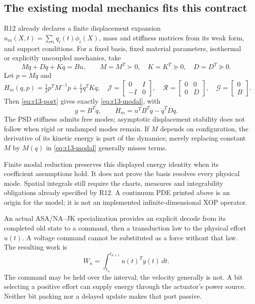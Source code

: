 \subsection{The existing modal mechanics fits this contract}
R12 already declares a finite displacement expansion
$u_m(X,t)=\sum_iq_i(t)\phi_i(X)$, mass and stiffness matrices from its weak
form, and support conditions. For a fixed basis, fixed material parameters,
isothermal or explicitly uncoupled mechanics, take
\begin{equation}
 M\ddot q+D\dot q+Kq=B u,\qquad
 M=M^T\succ0,\quad K=K^T\succeq0,\quad D=D^T\succeq0.
 \label{eq:r13-modal}
\end{equation}
Let $p=M\dot q$ and
\begin{equation}
 H_m(q,p)=\tfrac12p^TM^{-1}p+\tfrac12q^TKq,
 \quad
 \mathcal J=\begin{bmatrix}0&I\\-I&0\end{bmatrix},\quad
 \mathcal R=\begin{bmatrix}0&0\\0&D\end{bmatrix},\quad
 \mathcal G=\begin{bmatrix}0\\B\end{bmatrix}.
\end{equation}
Then \eqref{eq:r13-port} gives exactly \eqref{eq:r13-modal}, with
\begin{equation}
 y=B^T\dot q,\qquad
 \dot H_m=u^TB^T\dot q-\dot q^TD\dot q .
 \label{eq:r13-modal-power}
\end{equation}
The PSD stiffness admits free modes; asymptotic displacement stability does
not follow when rigid or undamped modes remain. If $M$ depends on configuration,
the derivative of its kinetic energy is part of the dynamics; merely replacing
constant $M$ by $M(q)$ in \eqref{eq:r13-modal} generally misses terms.

Finite modal reduction preserves this displayed energy identity when its
coefficient assumptions hold. It does not prove the basis resolves every
physical mode. Spatial integrals still require the charts, measures and
integrability obligations already specified by R12. A continuum PDE printed
above is an origin for the model; it is not an implemented infinite-dimensional
XOP operator.

An actual ASA/NA--JK specialization provides an explicit decode from its
completed old state to a command, then a transduction law to the physical
effort $u(t)$. A voltage command cannot be substituted as a force without
that law. The resulting work is
\begin{equation}
 W_n=\int_{t_n}^{t_{n+1}}u(t)^Ty(t)\,dt .
 \label{eq:r13-command-work}
\end{equation}
The command may be held over the interval; the velocity generally is not.
A bit selecting a positive effort can supply energy through the actuator's
power source. Neither bit packing nor a delayed update makes that port passive.

